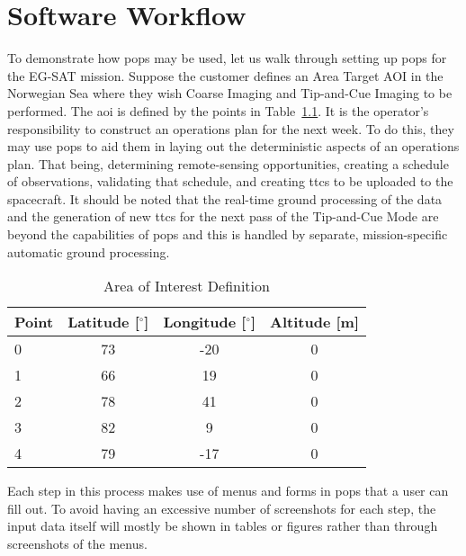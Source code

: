 \glsresetall{} 


\chapter{Software Workflow}\label{chap:workflow}

\lettrine[lines=2, findent=0pt, nindent=5pt]{T}{}o demonstrate how \gls{pops}
may be used, let us walk through setting up \gls{pops} for the EG-SAT mission.
Suppose the customer defines an Area Target AOI in the Norwegian Sea where they
wish Coarse Imaging and Tip-and-Cue Imaging to be performed. The \gls{aoi} is
defined by the points  in Table~\ref{tab:norway-aoi}. It is the operator’s
responsibility to construct an operations plan for the next week. To do this,
they may use \gls{pops} to aid them in laying out the deterministic aspects of
an operations plan.  That being, determining remote-sensing opportunities,
creating a schedule of observations, validating that schedule, and creating
\glspl{ttc} to be uploaded to the spacecraft. It should be noted that the
real-time ground processing of the data and the generation of new \glspl{ttc}
for the next pass of the Tip-and-Cue Mode are beyond the capabilities of
\gls{pops} and this is handled by separate, mission-specific automatic ground
processing.

\begin{table}[h] 
    \centering
    \caption{Area of Interest Definition}
    \begin{tabular}{cccc}
	Point                  & Latitude [$^\circ$] & Longitude [$^\circ$] & Altitude [m] \\ \hline
	\multicolumn{1}{l|}{0} & 73       & -20      & 0        \\
	\multicolumn{1}{l|}{1} & 66       & 19       & 0        \\
	\multicolumn{1}{l|}{2} & 78       & 41       & 0        \\
	\multicolumn{1}{l|}{3} & 82       & 9        & 0        \\
	\multicolumn{1}{l|}{4} & 79       & -17      & 0       
    \end{tabular}
    \label{tab:norway-aoi}
\end{table}

Each step in this process makes use of menus and forms in \gls{pops} that a
user can fill out. To avoid having an excessive number of screenshots for each
step, the input data itself will mostly be shown in tables or figures rather than
through screenshots of the menus.

